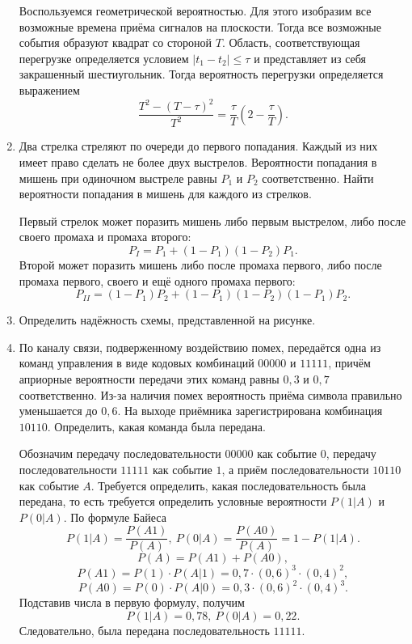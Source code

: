 \begin{enumerate}
        Воспользуемся геометрической вероятностью. Для этого изобразим все
        возможные времена приёма сигналов на плоскости. Тогда все возможные
        события образуют квадрат со стороной \( T \). Область, соответствующая
        перегрузке определяется условием \( |t_1 - t_2| \le \tau \) и
        представляет из себя закрашенный шестиугольник. Тогда вероятность
        перегрузки определяется выражением
        \[
            \frac{T^2 - (T-\tau)^2}{T^2} =
            \frac{\tau}{T}\left(2 - \frac{\tau}{T}\right).
        \]

    \item Два стрелка стреляют по очереди до первого попадания. Каждый из них
        имеет право сделать не более двух выстрелов. Вероятности попадания в
        мишень при одиночном выстреле равны \( P_1 \) и \( P_2 \)
        соответственно. Найти вероятности попадания в мишень для каждого из
        стрелков.

        Первый стрелок может поразить мишень либо первым выстрелом, либо после
        своего промаха и промаха второго:
        \[
            P_I = P_1 + (1 - P_1)(1 - P_2)P_1.
        \]
        Второй может поразить мишень либо после промаха первого, либо после
        промаха первого, своего и ещё одного промаха первого:
        \[
            P_{II} = (1 - P_1) P_2 + (1 - P_1)(1 - P_2)(1 - P_1)P_2.
        \]
    \item Определить надёжность схемы, представленной на рисунке.
    \item По каналу связи, подверженному воздействию помех, передаётся одна из
        команд управления в виде кодовых комбинаций \( 00000 \) и \( 11111 \),
        причём априорные вероятности передачи этих команд равны \( 0,3 \) и
        \( 0,7 \) соответственно. Из-за наличия помех вероятность приёма символа
        правильно уменьшается до \( 0,6 \). На выходе приёмника зарегистрирована
        комбинация \( 10110 \). Определить, какая команда была передана.

        Обозначим передачу последовательности \( 00000 \) как событие \( 0 \),
        передачу последовательности \( 11111 \) как событие \( 1 \), а приём
        последовательности \( 10110 \) как событие \( A \). Требуется
        определить, какая последовательность была передана, то есть требуется
        определить условные вероятности \( P(1|A) \) и \( P(0|A) \). По формуле
        Байеса
        \[
            P(1|A) = \frac{P(A1)}{P(A)},\ P(0|A) = \frac{P(A0)}{P(A)} =
            1 - P(1|A).
        \]
        \[
            P(A) = P(A1) + P(A0),
        \]
        \[
            P(A1) = P(1) \cdot P(A|1) = 0,7\cdot(0,6)^3\cdot(0,4)^2,
        \]
        \[
            P(A0) = P(0) \cdot P(A|0) = 0,3\cdot(0,6)^2\cdot(0,4)^3.
        \]
        Подставив числа в первую формулу, получим
        \[
            P(1|A) = 0,78,\ P(0|A) = 0,22.
        \]
        Следовательно, была передана последовательность \( 11111 \).


\end{enumerate}
